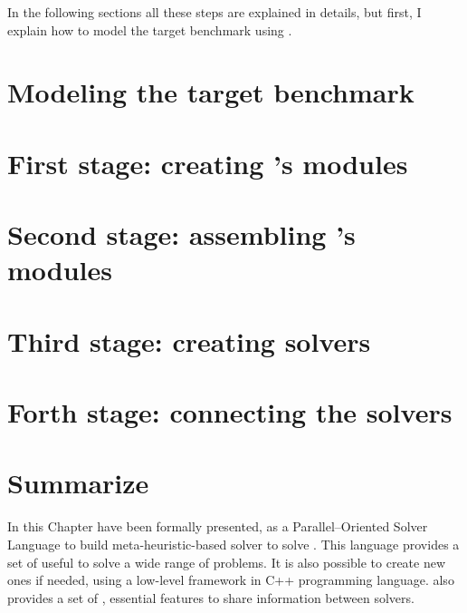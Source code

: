 
In the following sections all these steps are explained in details, but first, I explain how to model the target benchmark using \posl.

\section{Modeling the target benchmark}
\label{sec:model}



\section{First stage: creating \posl's modules}
\label{sec:1ststage}



\section{Second stage: assembling \posl's modules}
\label{sec:2ndstage}



\section{Third stage: creating \posl{} solvers}
\label{sec:3rdstage}



\section{Forth stage: connecting the solvers}
\label{sec:4thstage}



\section{Summarize}
\label{sec:posl_zum}

In this Chapter \posl{} have been formally presented, as a Parallel--Oriented Solver Language to build meta-heuristic-based solver to solve \CSPs{}. This language provides a set of \oms{} useful to solve a wide range of problems. It is also possible to create new ones if needed, using a low-level framework in C++ programming language. \posl{} also provides a set of \opchs{}, essential features to share information between solvers.

